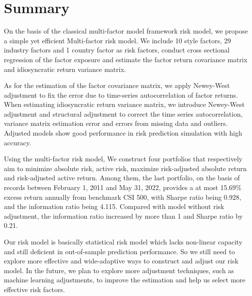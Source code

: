 \documentclass[10pt]{article}
\begin{document}
\newpage
\section{Summary}

On the basis of the classical multi-factor model framework risk model, we propose a simple yet efficient Multi-factor risk model. We include 10 style factors, 29 industry factors and 1 country factor as risk factors, conduct cross sectional regression of the factor exposure and estimate the factor return covariance matrix and  idiosyncratic return variance matrix.

As for the estimation of the factor covariance matrix, we apply Newey-West adjustment to fix the error due to time-series autocorrelation of factor returns.
When estimating idiosyncratic return variance matrix, we introduce Newey-West adjustment and structural adjustment to correct the time series autocorrelation, variance matrix estimation error and errors from missing data and outliers. Adjusted models show good performance in risk prediction simulation with high accuracy.

Using the multi-factor risk model, We construct four portfolios that respectively aim to minimize absolute risk, active risk, maximize risk-adjusted absolute return and risk-adjusted active return.
Among them, the last portfolio, on the basis of records between February 1, 2011 and May 31, 2022, provides a at most 15.69\% excess return annually from benchmark CSI 500, with Sharpe ratio being 0.928, and the information ratio being 4.115. 
Compared with model without risk adjustment, the information ratio increased by more than 1 and Sharpe ratio by 0.21.

Our risk model is basically statistical risk model which lacks non-linear capacity and still deficient in out-of-sample prediction performance. So we still need to explore more effective and wide-adaptive ways to construct and adjust our risk model. In the future, we plan to explore more adjustment techniques, such as machine learning adjustments, to improve the estimation and help us select more effective risk factors.
\end{document}

